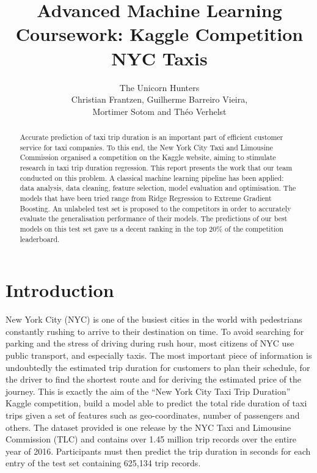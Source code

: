 \documentclass[a4paper]{article}
\author{The Unicorn Hunters\\
Christian Frantzen, Guilherme Barreiro Vieira,\\
Mortimer Sotom and Théo Verhelst}
\title{Advanced Machine Learning Coursework: Kaggle Competition NYC Taxis}
\begin{document}
\maketitle


\begin{abstract}
Accurate prediction of taxi trip duration is an important part of efficient
customer service for taxi companies. To this end, the New York City Taxi
and Limousine Commission organised a competition on the Kaggle website, aiming
to stimulate research in taxi trip duration regression. This report presents the
work that our team conducted on this problem. A classical machine learning
pipeline has been applied: data analysis, data cleaning, feature selection,
model evaluation and optimisation. The models that have been tried range from
Ridge Regression to Extreme Gradient Boosting. An unlabeled test set is proposed
to the competitors in order to accurately evaluate the generalisation
performance of their models. The predictions of our best models on this test set
gave us a decent ranking in the top 20\% of the competition leaderboard.
\end{abstract}

\section{Introduction}
New York City (NYC) is one of the busiest cities in the world with pedestrians
constantly rushing to arrive to their destination on time. To avoid searching
for parking and the stress of driving during rush hour, most citizens of NYC use
public transport, and especially taxis. The most important piece of information
is undoubtedly the estimated trip duration for customers to plan their schedule,
for the driver to find the shortest route and for deriving the estimated price
of the journey. This is exactly the aim of the ``New York City Taxi Trip
Duration'' Kaggle competition, build a model able to predict the total ride
duration of taxi trips given a set of features such as geo-coordinates, number
of passengers and others. The dataset provided is one release by the NYC Taxi
and Limousine Commission (TLC) and contains over 1.45 million trip records over
the entire year of 2016. Participants must then predict the trip duration in
seconds for each entry of the test set containing 625,134 trip records.
\end{document}
